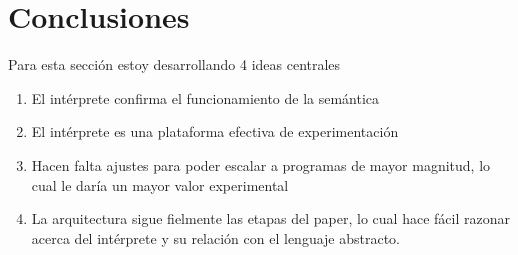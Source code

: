 
\newpage
\section{Conclusiones}
Para esta sección estoy desarrollando 4 ideas centrales
\begin{enumerate}
\item El intérprete confirma el funcionamiento de la semántica
\item El intérprete es una plataforma efectiva de experimentación
\item Hacen falta ajustes para poder escalar a programas de mayor magnitud, lo cual le daría un mayor valor experimental
\item La arquitectura sigue fielmente las etapas del paper, lo cual hace fácil razonar acerca del intérprete y su relación con el lenguaje abstracto.
  \end{enumerate}
